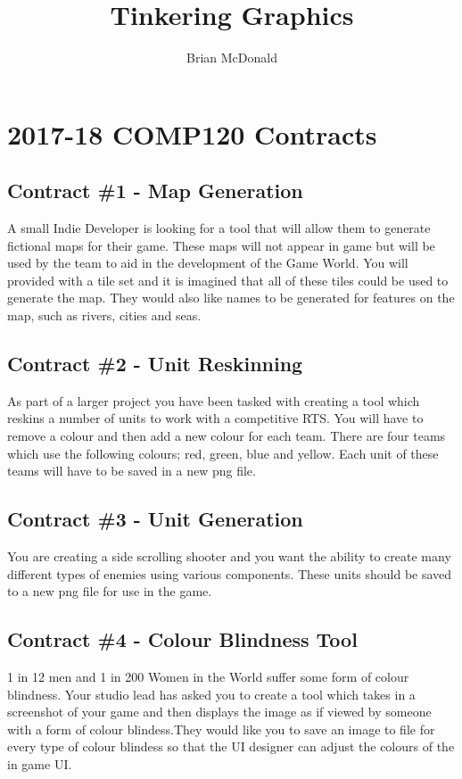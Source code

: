 \documentclass{../../fal_assignment}
\title{Tinkering Graphics}
\author{Brian McDonald}
\begin{document}
\section*{2017-18 COMP120 Contracts}

\subsection*{Contract \#1 - Map Generation}
A small Indie Developer is looking for a tool that will allow them to generate fictional maps for their game. These maps will not appear in game but will be used by the team to aid in the development of the Game World. You will provided with a tile set and it is imagined that all of these tiles could be used to generate the map. They would also like names to be generated for features on the map, such as rivers, cities and seas.

\subsection*{Contract \#2 - Unit Reskinning}
As part of a larger project you have been tasked with creating a tool which reskins a number of units to work with a competitive RTS. You will have to remove a colour and then add a new colour for each team. There are four teams which use the following colours; red, green, blue and yellow. Each unit of these teams will have to be saved in a new png file.

\subsection*{Contract \#3 - Unit Generation}
You are creating a side scrolling shooter and you want the ability to create many different types of enemies using various components. These units should be saved to a new png file for use in the game.

\subsection*{Contract \#4 - Colour Blindness Tool}
1 in 12 men and 1 in 200 Women in the World suffer some form of colour blindness. Your studio lead has asked you to create a tool which takes in a screenshot of your game and then displays the image as if viewed by someone with a form of colour blindess.They would like you to save an image to file for every type of colour blindess so that the UI designer can adjust the colours of the in game UI.
\end{document}
